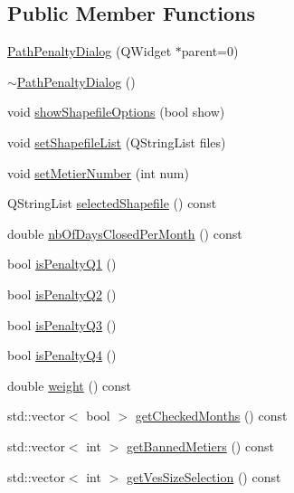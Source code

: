 \subsection*{Public Member Functions}
\begin{DoxyCompactItemize}
\item 
\mbox{\hyperlink{class_path_penalty_dialog_a7cc8ca649adb1ddc234be0c8df249010}{Path\+Penalty\+Dialog}} (Q\+Widget $\ast$parent=0)
\item 
\mbox{\hyperlink{class_path_penalty_dialog_a3a35f2063d4924294186b1038753df09}{$\sim$\+Path\+Penalty\+Dialog}} ()
\item 
void \mbox{\hyperlink{class_path_penalty_dialog_af3fcfb6469a2cb4b1af08c3c98069558}{show\+Shapefile\+Options}} (bool show)
\item 
void \mbox{\hyperlink{class_path_penalty_dialog_a0ec09025847eb5e5b70c29610c799d00}{set\+Shapefile\+List}} (Q\+String\+List files)
\item 
void \mbox{\hyperlink{class_path_penalty_dialog_a08306b3fac29a07635623e6dcab8fc75}{set\+Metier\+Number}} (int num)
\item 
Q\+String\+List \mbox{\hyperlink{class_path_penalty_dialog_a0e70fc5ccaab33cbc6eb2c200a1b2352}{selected\+Shapefile}} () const
\item 
double \mbox{\hyperlink{class_path_penalty_dialog_a16026d938b480060797b3e1812b1a4a0}{nb\+Of\+Days\+Closed\+Per\+Month}} () const
\item 
bool \mbox{\hyperlink{class_path_penalty_dialog_a18f54f451cf15f61353544233467d232}{is\+Penalty\+Q1}} ()
\item 
bool \mbox{\hyperlink{class_path_penalty_dialog_abee803213ef3e63175186b4001daa103}{is\+Penalty\+Q2}} ()
\item 
bool \mbox{\hyperlink{class_path_penalty_dialog_aef3d0a7df824dd86e1afeaea8e3c5521}{is\+Penalty\+Q3}} ()
\item 
bool \mbox{\hyperlink{class_path_penalty_dialog_af611f8283343f98b89922a356d1f3041}{is\+Penalty\+Q4}} ()
\item 
double \mbox{\hyperlink{class_path_penalty_dialog_a581281d54ad59abaf75d3f7a6513e866}{weight}} () const
\item 
std\+::vector$<$ bool $>$ \mbox{\hyperlink{class_path_penalty_dialog_a5e2f5e89437d158f37ac63cc88123155}{get\+Checked\+Months}} () const
\item 
std\+::vector$<$ int $>$ \mbox{\hyperlink{class_path_penalty_dialog_a045a27085159262c6df54b5163216ffc}{get\+Banned\+Metiers}} () const
\item 
std\+::vector$<$ int $>$ \mbox{\hyperlink{class_path_penalty_dialog_ad4f942d28ba235591ec9b083b4f3fa5e}{get\+Ves\+Size\+Selection}} () const
\end{DoxyCompactItemize}


